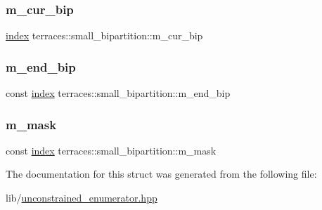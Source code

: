 \subsubsection{\texorpdfstring{m\+\_\+cur\+\_\+bip}{m\_cur\_bip}}
{\footnotesize\ttfamily \hyperlink{namespaceterraces_adbc33ccb543d1634e96d0eb02e472c77}{index} terraces\+::small\+\_\+bipartition\+::m\+\_\+cur\+\_\+bip}

\mbox{\label{structterraces_1_1small__bipartition_a651c1de5e73b81eefef2497427f9c96c}} 
\subsubsection{\texorpdfstring{m\+\_\+end\+\_\+bip}{m\_end\_bip}}
{\footnotesize\ttfamily const \hyperlink{namespaceterraces_adbc33ccb543d1634e96d0eb02e472c77}{index} terraces\+::small\+\_\+bipartition\+::m\+\_\+end\+\_\+bip}

\mbox{\label{structterraces_1_1small__bipartition_a23458569da8f6402a4c2395a9f5e056f}} 
\subsubsection{\texorpdfstring{m\+\_\+mask}{m\_mask}}
{\footnotesize\ttfamily const \hyperlink{namespaceterraces_adbc33ccb543d1634e96d0eb02e472c77}{index} terraces\+::small\+\_\+bipartition\+::m\+\_\+mask}



The documentation for this struct was generated from the following file\+:\begin{DoxyCompactItemize}
\item 
lib/\hyperlink{unconstrained__enumerator_8hpp}{unconstrained\+\_\+enumerator.\+hpp}\end{DoxyCompactItemize}
